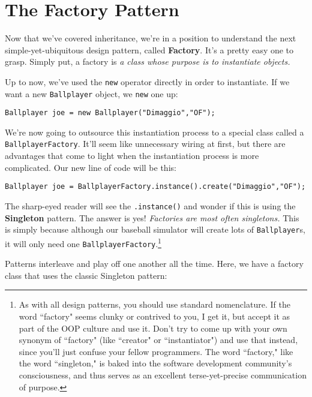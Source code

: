 
\chapter{The Factory Pattern}

Now that we've covered inheritance, we're in a position to understand the next
simple-yet-ubiquitous design pattern, called \textbf{Factory}. It's a pretty
easy one to grasp. Simply put, a factory is \textit{a class whose purpose is
to instantiate objects.}

Up to now, we've used the \texttt{new} operator directly in order to
instantiate. If we want a new \texttt{Ballplayer} object, we \texttt{new} one
up:

\begin{Verbatim}[fontsize=\small,samepage=true,frame=none]
  Ballplayer joe = new Ballplayer("Dimaggio","OF");
\end{Verbatim}

We're now going to outsource this instantiation process to a special class
called a \texttt{BallplayerFactory}. It'll seem like unnecessary wiring at
first, but there are advantages that come to light when the instantiation
process is more complicated. Our new line of code will be this:

\begin{Verbatim}[fontsize=\small,samepage=true,frame=none]
  Ballplayer joe = BallplayerFactory.instance().create("Dimaggio","OF");
\end{Verbatim}

The sharp-eyed reader will see the \texttt{.instance()} and wonder if this is
using the \textbf{Singleton} pattern. The answer is yes! \textit{Factories are
most often singletons.} This is simply because although our baseball simulator
will create lots of \texttt{Ballplayer}s, it will only need one
\texttt{BallplayerFactory}.\footnote{As with all design patterns, you should
use standard nomenclature. If the word ``factory" seems clunky or contrived to
you, I get it, but accept it as part of the OOP culture and use it. Don't try
to come up with your own synonym of ``factory" (like ``creator" or
``instantiator") and use that instead, since you'll just confuse your fellow
programmers. The word ``factory," like the word ``singleton," is baked into
the software development community's consciousness, and thus serves as an
excellent terse-yet-precise communication of purpose.}

Patterns interleave and play off one another all the time. Here, we have a
factory class that uses the classic Singleton pattern:

